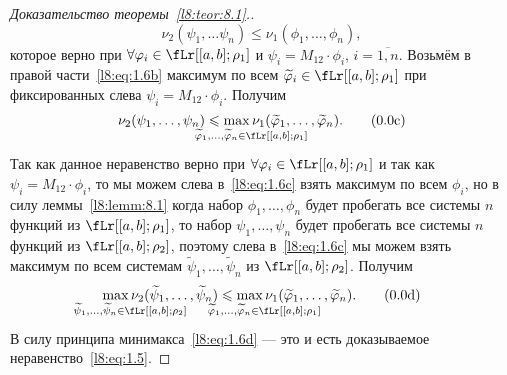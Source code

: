 \begin{proof}[Доказательство теоремы~\ref{l8:teor:8.1}.]
\begin{equation}
		\nu_2(\psi_1,\ldots\psi_n)\leqslant\nu_1(\phi_1,\ldots,\phi_n)\tag{\theequation b},
	\end{equation}
	которое верно при $\forall\phi_i\in\fLr[{[a,b];\rho_1}]$ и $\psi_i=M_{12}\cdot\phi_i$, $i=\overline{1,n}$. Возьмём в правой части~\eqref{l8:eq:1.6b} максимум по всем $\widetilde{\phi}_i\in\fLr[{[a,b];\rho_1}]$ при фиксированных слева $\psi_i=M_{12}\cdot\phi_i$. Получим
	\begin{equation}\label{l8:eq:1.6c}
		\nu_2(\psi_1,\ldots,\psi_n)\leqslant\max\limits_{\lefteqn{\vphantom{\big(}\scriptstyle \widetilde{\phi}_1,\ldots,\widetilde{\phi}_n\in\fLr[{[a,b];\rho_1}]}}\nu_1(\widetilde{\phi}_1,\ldots,\widetilde{\phi}_n).\tag{\theequation c}
	\end{equation}
	Так как данное неравенство верно при $\forall\phi_i\in\fLr[{[a,b];\rho_1}]$ и так как $\psi_i=M_{12}\cdot\phi_i$, то мы можем слева в~\eqref{l8:eq:1.6c} взять максимум по всем $\phi_i$, но в силу леммы~\ref{l8:lemm:8.1} когда набор $\phi_1,\ldots,\phi_n$ будет пробегать все системы $n$ функций из $\fLr[{[a,b];\rho_1}]$, то набор $\psi_1,\ldots,\psi_n$ будет пробегать все системы $n$ функций из $\fLr[{[a,b];\rho_2}]$, поэтому слева в~\eqref{l8:eq:1.6c} мы можем взять максимум по всем системам $\widetilde{\psi}_1,\ldots,\widetilde{\psi}_n$ из $\fLr[{[a,b];\rho_2}]$. Получим
	\begin{equation}\label{l8:eq:1.6d}
		\max\limits_{\lefteqn{\vphantom{\big(}\scriptstyle \widetilde{\psi}_1,\ldots,\widetilde{\psi}_n\in\fLr[{[a,b];\rho_2}]}}\nu_2(\widetilde{\psi}_1,\ldots,\widetilde{\psi}_n)\leqslant\max\limits_{\lefteqn{\vphantom{\big(}\scriptstyle \widetilde{\phi}_1,\ldots,\widetilde{\phi}_n\in\fLr[{[a,b];\rho_1}]}}\nu_1(\widetilde{\phi}_1,\ldots,\widetilde{\phi}_n).\tag{\theequation d}
	\end{equation}
	В силу принципа минимакса~\eqref{l8:eq:1.6d} --- это и есть доказываемое неравенство~\eqref{l8:eq:1.5}.
\end{proof}

